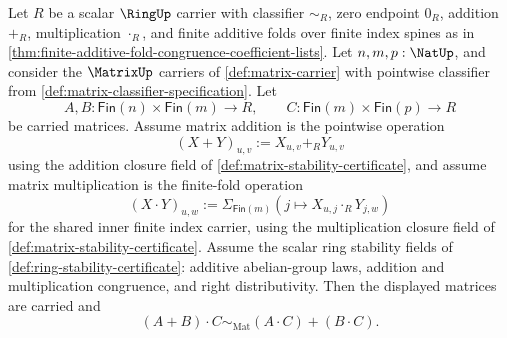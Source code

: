 \begin{theorem}
\label{thm:matrix-multiplication-right-distributes-over-addition}
Let $R$ be a scalar $\RingUp$ carrier with classifier $\sim_R$, zero endpoint $0_R$, addition $+_R$, multiplication $\cdot_R$, and finite additive folds over finite index spines as in \autoref{thm:finite-additive-fold-congruence-coefficient-lists}. Let $n,m,p:\NatUp$, and consider the $\MatrixUp$ carriers of \autoref{def:matrix-carrier} with pointwise classifier from \autoref{def:matrix-classifier-specification}. Let
$$
A,B:\mathsf{Fin}(n)\times\mathsf{Fin}(m)\to R,
\qquad
C:\mathsf{Fin}(m)\times\mathsf{Fin}(p)\to R
$$
be carried matrices. Assume matrix addition is the pointwise operation
$$
(X+Y)_{u,v}:=X_{u,v}+_RY_{u,v}
$$
using the addition closure field of \autoref{def:matrix-stability-certificate}, and assume matrix multiplication is the finite-fold operation
$$
(X\cdot Y)_{u,w}:=\Sigma_{\mathsf{Fin}(m)}(j\mapsto X_{u,j}\cdot_RY_{j,w})
$$
for the shared inner finite index carrier, using the multiplication closure field of \autoref{def:matrix-stability-certificate}. Assume the scalar ring stability fields of \autoref{def:ring-stability-certificate}: additive abelian-group laws, addition and multiplication congruence, and right distributivity. Then the displayed matrices are carried and
$$
(A+B)\cdot C\sim_{\mathrm{Mat}}(A\cdot C)+(B\cdot C).
$$
\end{theorem}
